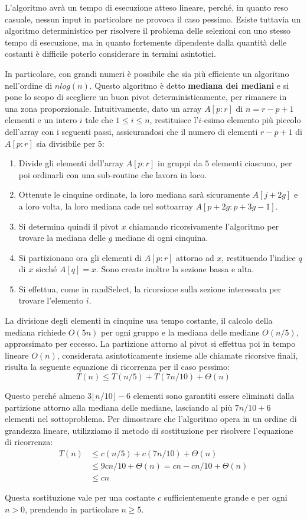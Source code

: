 \noindent L'algoritmo avrà un tempo di esecuzione atteso lineare, perché, in quanto reso casuale, nessun input in particolare ne provoca il caso pessimo.
Esiste tuttavia un algoritmo deterministico per risolvere il problema delle selezioni con uno stesso tempo di esecuzione, ma in quanto fortemente
dipendente dalla quantità delle costanti è difficile poterlo considerare in termini asintotici.\par
In particolare, con grandi numeri è possibile che sia più efficiente un algoritmo nell'ordine di $nlog(n)$. Questo algoritmo è detto \textbf{mediana
dei mediani} e si pone lo scopo di scegliere un buon pivot deterministicamente, per rimanere in una zona proporzionale. Intuitivamente, dato un array
$A[p:r]$ di $n = r-p+1$ elementi e un intero $i$ tale che $1\leq i\leq n$, restituisce l'$i$-esimo elemento più piccolo dell'array con i seguenti
passi, assicurandosi che il numero di elementi $r-p+1$ di $A[p:r]$ sia divisibile per $5$: \begin{enumerate}
	\item Divide gli elementi dell'array $A[p:r]$ in gruppi da $5$ elementi ciascuno, per poi ordinarli con una sub-routine che lavora in loco.
	\item Ottenute le cinquine ordinate, la loro mediana sarà sicuramente $A[j+2g]$ e a loro volta, la loro mediana cade nel sottoarray
	$A[p+2g:p+3g-1]$.
	\item Si determina quindi il pivot $x$ chiamando ricorsivamente l'algoritmo per trovare la mediana delle $g$ mediane di ogni cinquina.
	\item Si partizionano ora gli elementi di $A[p:r]$ attorno ad $x$, restituendo l'indice $q$ di $x$ sicché $A[q]=x$. Sono create inoltre la sezione
	bassa e alta.
	\item Si effettua, come in randSelect, la ricorsione sulla sezione interessata per trovare l'elemento $i$.
\end{enumerate}

\noindent La divisione degli elementi in cinquine usa tempo costante, il calcolo della mediana richiede $O(5n)$ per ogni gruppo e la mediana delle
mediane $O(n/5)$, approssimato per eccesso. La partizione attorno al pivot si effettua poi in tempo lineare $O(n)$, considerata asintoticamente insieme
alle chiamate ricorsive finali, risulta la seguente equazione di ricorrenza per il caso pessimo: \[
	T(n) \leq T(n/5) + T(7n/10) + \Theta(n)
\]

\noindent Questo perché almeno $3\lfloor n/10 \rfloor - 6$ elementi sono garantiti essere eliminati dalla partizione attorno alla mediana delle mediane,
lasciando al più $7n/10+6$ elementi nel sottoproblema. Per dimostrare che l'algoritmo opera in un ordine di grandezza lineare, utilizziamo il metodo di
sostituzione per risolvere l'equazione di ricorrenza: \begin{equation}
	\begin{split}
		T(n) &\leq c(n/5) + c(7n/10) + \Theta(n)\\
			&\leq 9cn/10 + \Theta(n) = cn - cn/10 + \Theta(n)\\
			&\leq cn
	\end{split}
\end{equation}

\noindent Questa sostituzione vale per una costante $c$ sufficientemente grande e per ogni $n > 0$, prendendo in particolare $n \geq 5$.